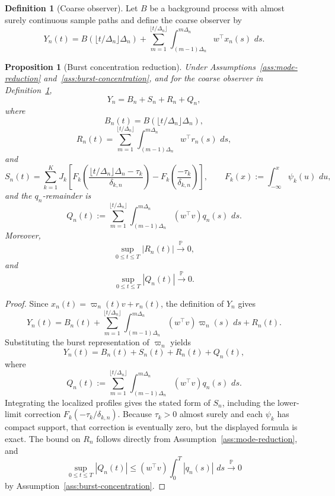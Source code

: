 \documentclass[11pt,a4paper]{amsart}
\theoremstyle{plain}
\newtheorem{proposition}[theorem]{Proposition}
\theoremstyle{definition}
\newtheorem{definition}[theorem]{Definition}
\theoremstyle{remark}
\newcommand{\PP}{\mathbb{P}}
\newcommand{\dd}{\,d}
\newcommand{\toP}{\xrightarrow{\PP}}
\begin{document}
\begin{definition}[Coarse observer]\label{def:coarse-observer}
Let \(B\) be a background process with almost surely continuous sample paths and define the coarse
observer by
\[
        Y_n(t)
        =
        B(\lfloor t/\Delta_n\rfloor \Delta_n)
        +
        \sum_{m=1}^{\lfloor t/\Delta_n\rfloor}
        \int_{(m-1)\Delta_n}^{m\Delta_n}
        w^\top x_n(s)\,\dd s.
\]
\end{definition}

\begin{proposition}[Burst concentration reduction]\label{prop:burst-reduction}
Under Assumptions~\ref{ass:mode-reduction} and~\ref{ass:burst-concentration}, and for the coarse
observer in Definition~\ref{def:coarse-observer},
\[
        Y_n=B_n+S_n+R_n+Q_n,
\]
where
\[
        B_n(t)=B(\lfloor t/\Delta_n\rfloor\Delta_n),
\]
\[
        R_n(t)=\sum_{m=1}^{\lfloor t/\Delta_n\rfloor}\int_{(m-1)\Delta_n}^{m\Delta_n} w^\top r_n(s)\,\dd s,
\]
and
\[
        S_n(t)
        =
        \sum_{k=1}^K
        J_k\left[
        F_k\!\left(\frac{\lfloor t/\Delta_n\rfloor\Delta_n-\tau_k}{\delta_{k,n}}\right)
        -
        F_k\!\left(\frac{-\tau_k}{\delta_{k,n}}\right)
        \right],
        \qquad
        F_k(x):=\int_{-\infty}^x \psi_k(u)\,\dd u,
\]
and the \(q_n\)-remainder is
\[
        Q_n(t):=
        \sum_{m=1}^{\lfloor t/\Delta_n\rfloor}\int_{(m-1)\Delta_n}^{m\Delta_n}(w^\top v)q_n(s)\,\dd s.
\]
Moreover,
\[
        \sup_{0\le t\le T}|R_n(t)|\toP0,
\]
and
\[
        \sup_{0\le t\le T}|Q_n(t)|\toP0.
\]
\end{proposition}

\begin{proof}
Since \(x_n(t)=\varpi_n(t)v+r_n(t)\), the definition of \(Y_n\) gives
\[
        Y_n(t)
        =
        B_n(t)
        +
        \sum_{m=1}^{\lfloor t/\Delta_n\rfloor}\int_{(m-1)\Delta_n}^{m\Delta_n}(w^\top v)\varpi_n(s)\,\dd s
        +
        R_n(t).
\]
Substituting the burst representation of \(\varpi_n\) yields
\[
        Y_n(t)=B_n(t)+S_n(t)+R_n(t)+Q_n(t),
\]
where
\[
        Q_n(t):=
        \sum_{m=1}^{\lfloor t/\Delta_n\rfloor}\int_{(m-1)\Delta_n}^{m\Delta_n}(w^\top v)q_n(s)\,\dd s.
\]
Integrating the localized profiles gives the stated form of \(S_n\), including the lower-limit
correction \(F_k(-\tau_k/\delta_{k,n})\).  Because \(\tau_k>0\) almost surely and each \(\psi_k\)
has compact support, that correction is eventually zero, but the displayed formula is exact.  The
bound on \(R_n\) follows directly from Assumption~\ref{ass:mode-reduction}, and
\[
        \sup_{0\le t\le T}|Q_n(t)|
        \le
        (w^\top v)\int_0^T |q_n(s)|\,\dd s
        \toP0
\]
by Assumption~\ref{ass:burst-concentration}.
\end{proof}
\end{document}
